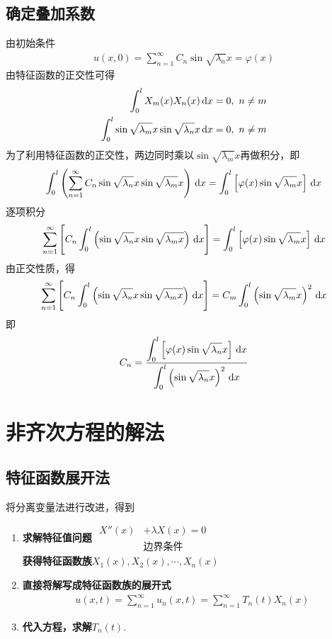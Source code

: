\subsection{确定叠加系数}
由初始条件
\begin{align*}
	u(x, 0) = \sum_{n = 1}^{\infty} C_n \sin \sqrt{\lambda_n} x = \varphi(x)
\end{align*}
由特征函数的正交性可得
\begin{align}
	\int_{0}^{l} X_m(x)X_n(x)\,{\rm{d}} x = 0, \,\, n \neq m\\
	\int_{0}^{l} \sin \sqrt{\lambda_m} x \sin \sqrt{\lambda_n} x \, {\rm{d}} x= 0, \,\, n \neq m
\end{align}
为了利用特征函数的正交性，两边同时乘以$\sin \sqrt{\lambda_m} x$再做积分，即
\begin{align}
	\int_{0}^{l} \left( \sum_{n= 1}^{\infty }C_n \sin \sqrt{\lambda_n} x \sin \sqrt{\lambda_m} x\right)\,{\rm{d}} x = \int_{0}^{l} \left[\varphi(x) \sin \sqrt{\lambda_m} x \right]\, {\rm{d}} x
\end{align}
逐项积分
\begin{align}
	\sum_{n= 1}^{\infty } \left[C_n \int_{0}^{l} \left(\sin \sqrt{\lambda_n}x \sin \sqrt{\lambda_m x} \right)\, {\rm{d}} x\right] =  \int_{0}^{l} \left[\varphi(x) \sin \sqrt{\lambda_m} x \right]\, {\rm{d}} x
\end{align}
由正交性质，得
\begin{align*}
	\sum_{n= 1}^{\infty } \left[C_n \int_{0}^{l} \left(\sin \sqrt{\lambda_n}x \sin \sqrt{\lambda_m x} \right)\, {\rm{d}} x\right] = C_m \int_{0}^{l} \left(\sin \sqrt{\lambda_m}x\right)^2 \, {\rm{d}} x
\end{align*}
即
\begin{align}
	C_n = \dfrac{\displaystyle \int_{0}^{l} \left[\varphi(x) \sin \sqrt{\lambda_n} x \right]\,{\rm{d}} x}{\displaystyle  \int_{0}^{l} \left(\sin \sqrt{\lambda_n}x\right)^2 \, {\rm{d}} x}
\end{align}

\section{非齐次方程的解法}
\subsection{特征函数展开法}
\noindent 将分离变量法进行改进，得到
\begin{enumerate}
	\item \textbf{求解特征值问题}
	$
	\begin{aligned}
		X''(x) &+ \lambda X(x) = 0\\
		&\mbox{边界条件}
	\end{aligned}
	$\\[0.5em]
	\textbf{获得特征函数族}$X_1(x),X_2(x), \cdots, X_n(x)$
	\item \textbf{直接将解写成特征函数族的展开式}
	\begin{align*}
		u(x, t) = \sum_{n = 1}^{\infty} u_n(x,t) = \sum_{n = 1}^{\infty } T_n(t)X_n(x)
	\end{align*}
	\item \textbf{代入方程，求解}$T_n(t)$.
\end{enumerate}

